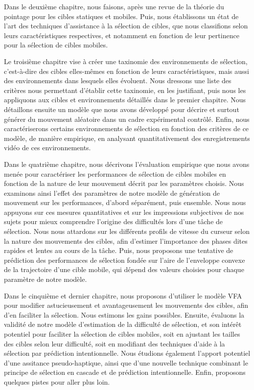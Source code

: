 	Dans le deuxième chapitre, nous faisons, après une revue de la théorie du pointage pour les cibles statiques et mobiles. Puis, nous établissons un état de l'art des techniques d'assistance à la sélection de cibles, que nous classifions selon leurs caractéristiques respectives, et notamment en fonction de leur pertinence pour la sélection de cibles mobiles.
	
	Le troisième chapitre vise à créer une taxinomie des environnements de sélection, c'est-à-dire des cibles elles-mêmes en fonction de leurs caractéristiques, mais aussi des environnements dans lesquels elles évoluent. Nous dressons une liste des critères nous permettant d'établir cette taxinomie, en les justifiant, puis nous les appliquons aux cibles et environnements détaillés dans le premier chapitre. Nous détaillons ensuite un modèle que nous avons développé pour décrire et surtout générer du mouvement aléatoire dans un cadre expérimental contrôlé. Enfin, nous caractériserons certains environnements de sélection en fonction des critères de ce modèle, de manière empirique, en analysant quantitativement des enregistrements vidéo de ces environnements.
	
	Dans le quatrième chapitre, nous décrivons l'évaluation empirique que nous avons menée pour caractériser les performances de sélection de cibles mobiles en fonction de la nature de leur mouvement décrit par les paramètres choisis. Nous examinons ainsi l'effet des paramètres de notre modèle de génération de mouvement sur les performances, d'abord séparément, puis ensemble. Nous nous appuyons sur ces mesures quantitatives et sur les impressions subjectives de nos sujets pour mieux comprendre l'origine des difficultés lors d'une tâche de sélection. Nous nous attardons sur les différents profils de vitesse du curseur selon la nature des mouvements des cibles, afin d'estimer l'importance des phases dites rapides et lentes au cours de la tâche. Puis, nous proposons une tentative de prédiction des performances de sélection fondée sur l'aire de l'enveloppe convexe de la trajectoire d'une cible mobile, qui dépend des valeurs choisies pour chaque paramètre de notre modèle.
	
	Dans le cinquième et dernier chapitre, nous proposons d'utiliser le modèle VFA pour modifier astucieusement et avantageusement les mouvements des cibles, afin d'en faciliter la sélection. Nous estimons les gains possibles. Ensuite, évaluons la validité de notre modèle d'estimation de la difficulté de sélection, et son intérêt potentiel pour faciliter la sélection de cibles mobiles, soit en ajustant les tailles des cibles selon leur difficulté, soit en modifiant des techniques d'aide à la sélection par prédiction intentionnelle. Nous étudions également l'apport potentiel d'une assitance pseudo-haptique, ainsi que d'une nouvelle technique combinant le principe de sélection en cascade et de prédiction intentionnelle. Enfin, proposons quelques pistes pour aller plus loin.